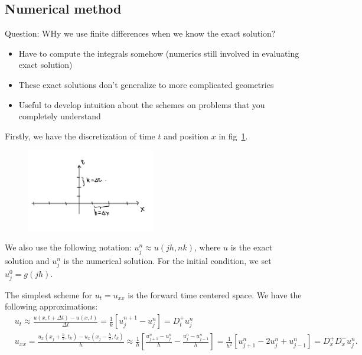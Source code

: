 \subsection{Numerical method} 


\begin{note}
Question: WHy we use finite differences when we know the exact solution? 
\begin{itemize}
    \item Have to compute the integrals somehow (numerics still involved in evaluating exact solution) 
    \item These exact solutions don't generalize to more complicated geometries 
    \item Useful to develop intuition about the schemes on problems that you completely understand
\end{itemize}
\end{note}

Firstly, we have the discretization of time $t$ and position $x$ in fig~\ref{fig: 1-discre}.
\begin{figure}[H]
    \centering
    \includegraphics[width=0.5\textwidth]{figures/1-discretization.png}
    \label{fig: 1-discre}
\end{figure}
We also use the following notation: $u_j^n \approx u(jh, nk)$, where $u$ is the exact solution and $u_j^n$ is the numerical solution. For the initial condition, we set $u_j^0 = g(jh)$.  

The simplest scheme for $u_t = u_{xx}$ is the forward time centered space. We have the following approximations: 
\begin{align*}
   & u_t \approx \frac{u(x, t+ \Delta  t) - u(x,t)}{ \Delta t } = \frac{1}{k}\left[ u_j^{n+1} - u_j^n \right] = D_t^+ u_j^n \\ 
    &u_{xx} = \frac{u_x(x_j+\frac{h}{2},t_k) - u_x(x_j - \frac{h}{2},t_k)}{h}\approx \frac{1}{h}[\frac{u_{j+1}^n -u_j^n}{h}- \frac{u_j^n - u_{ j-1 } ^n}{h}] = \frac{1}{h^2}[u_{j+1}^n - 2u_j^n + u_{j-1}^n ] = D_x^+ D_x^- u_j^n. 
\end{align*}


